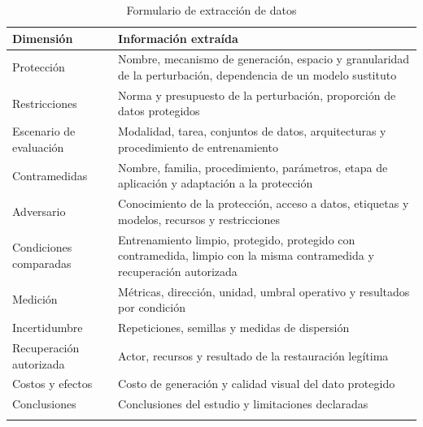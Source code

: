 \begin{table}[t]
\caption{Formulario de extracción de datos}\label{tab:extraccion}
\footnotesize
\begin{tabularx}{\textwidth}{@{}L{3.2cm}Y{1.0}@{}}
\toprule
Dimensión & Información extraída \\
\midrule
Protección & Nombre, mecanismo de generación, espacio y granularidad de la perturbación, dependencia de un modelo sustituto \\
Restricciones & Norma y presupuesto de la perturbación, proporción de datos protegidos \\
Escenario de evaluación & Modalidad, tarea, conjuntos de datos, arquitecturas y procedimiento de entrenamiento \\
Contramedidas & Nombre, familia, procedimiento, parámetros, etapa de aplicación y adaptación a la protección \\
Adversario & Conocimiento de la protección, acceso a datos, etiquetas y modelos, recursos y restricciones \\
Condiciones comparadas & Entrenamiento limpio, protegido, protegido con contramedida, limpio con la misma contramedida y recuperación autorizada \\
Medición & Métricas, dirección, unidad, umbral operativo y resultados por condición \\
Incertidumbre & Repeticiones, semillas y medidas de dispersión \\
Recuperación autorizada & Actor, recursos y resultado de la restauración legítima \\
Costos y efectos & Costo de generación y calidad visual del dato protegido \\
Conclusiones & Conclusiones del estudio y limitaciones declaradas \\
\botrule
\end{tabularx}
\end{table}

